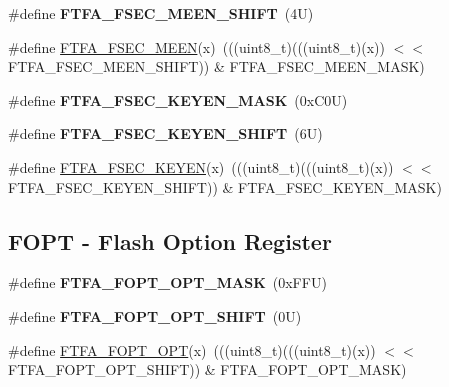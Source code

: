 \begin{DoxyCompactItemize}
\mbox{\label{group___f_t_f_a___register___masks_gab4ae1ea1634e962a9b420433b1d02e81}} 
\#define {\bfseries F\+T\+F\+A\+\_\+\+F\+S\+E\+C\+\_\+\+M\+E\+E\+N\+\_\+\+S\+H\+I\+FT}~(4\+U)
\item 
\#define \mbox{\hyperlink{group___f_t_f_a___register___masks_gabacff1abeb4f7ac2bdd162955446ebab}{F\+T\+F\+A\+\_\+\+F\+S\+E\+C\+\_\+\+M\+E\+EN}}(x)~(((uint8\+\_\+t)(((uint8\+\_\+t)(x)) $<$$<$ F\+T\+F\+A\+\_\+\+F\+S\+E\+C\+\_\+\+M\+E\+E\+N\+\_\+\+S\+H\+I\+FT)) \& F\+T\+F\+A\+\_\+\+F\+S\+E\+C\+\_\+\+M\+E\+E\+N\+\_\+\+M\+A\+SK)
\item 
\mbox{\label{group___f_t_f_a___register___masks_ga6c9887828940e3a922c4b93037557df2}} 
\#define {\bfseries F\+T\+F\+A\+\_\+\+F\+S\+E\+C\+\_\+\+K\+E\+Y\+E\+N\+\_\+\+M\+A\+SK}~(0x\+C0\+U)
\item 
\mbox{\label{group___f_t_f_a___register___masks_gab067e78749f412c158925484b07400c0}} 
\#define {\bfseries F\+T\+F\+A\+\_\+\+F\+S\+E\+C\+\_\+\+K\+E\+Y\+E\+N\+\_\+\+S\+H\+I\+FT}~(6\+U)
\item 
\#define \mbox{\hyperlink{group___f_t_f_a___register___masks_ga92eb0ddc48393a53bf7109d6dac8c342}{F\+T\+F\+A\+\_\+\+F\+S\+E\+C\+\_\+\+K\+E\+Y\+EN}}(x)~(((uint8\+\_\+t)(((uint8\+\_\+t)(x)) $<$$<$ F\+T\+F\+A\+\_\+\+F\+S\+E\+C\+\_\+\+K\+E\+Y\+E\+N\+\_\+\+S\+H\+I\+FT)) \& F\+T\+F\+A\+\_\+\+F\+S\+E\+C\+\_\+\+K\+E\+Y\+E\+N\+\_\+\+M\+A\+SK)
\end{DoxyCompactItemize}
\subsection*{F\+O\+PT -\/ Flash Option Register}
\begin{DoxyCompactItemize}
\item 
\mbox{\label{group___f_t_f_a___register___masks_ga779df0be2be88c60f0c9e8e98850d479}} 
\#define {\bfseries F\+T\+F\+A\+\_\+\+F\+O\+P\+T\+\_\+\+O\+P\+T\+\_\+\+M\+A\+SK}~(0x\+F\+F\+U)
\item 
\mbox{\label{group___f_t_f_a___register___masks_ga89bbb59793ccc7cb270b4a285c73062f}} 
\#define {\bfseries F\+T\+F\+A\+\_\+\+F\+O\+P\+T\+\_\+\+O\+P\+T\+\_\+\+S\+H\+I\+FT}~(0\+U)
\item 
\#define \mbox{\hyperlink{group___f_t_f_a___register___masks_ga490833607b9534df37400600d5e4a1dd}{F\+T\+F\+A\+\_\+\+F\+O\+P\+T\+\_\+\+O\+PT}}(x)~(((uint8\+\_\+t)(((uint8\+\_\+t)(x)) $<$$<$ F\+T\+F\+A\+\_\+\+F\+O\+P\+T\+\_\+\+O\+P\+T\+\_\+\+S\+H\+I\+FT)) \& F\+T\+F\+A\+\_\+\+F\+O\+P\+T\+\_\+\+O\+P\+T\+\_\+\+M\+A\+SK)
\end{DoxyCompactItemize}
